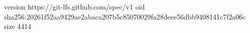 version https://git-lfs.github.com/spec/v1
oid sha256:20261f52aa9429ae2abaca207b5c85070029fa28deee56dbb9408141c7f2a06c
size 4414
